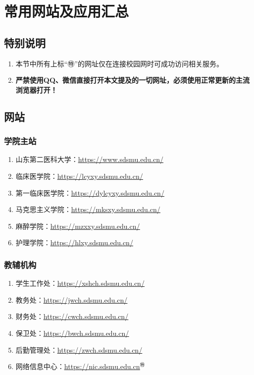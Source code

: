 \chapter[常用网站及应用汇总]{常用网站及应用汇总}

\section*{特别说明}
\begin{enumerate}
    \item 本节中所有上标“㊕”的网址仅在连接校园网时可成功访问相关服务。
    \item \textbf{严禁使用QQ、微信直接打开本文提及的一切网址，必须使用正常更新的主流浏览器打开！}
\end{enumerate}

\section[网站]{网站}
\subsection[学院主站]{学院主站}
\begin{enumerate}
    \item 山东第二医科大学：\uline{\href{https://www.sdsmu.edu.cn/}{https://www.sdsmu.edu.cn/}}
    \item 临床医学院：\uline{\href{https://lcyxy.sdsmu.edu.cn/}{https://lcyxy.sdsmu.edu.cn/}}
    \item 第一临床医学院：\uline{\href{https://dylcyxy.sdsmu.edu.cn/}{https://dylcyxy.sdsmu.edu.cn/}}
    \item 马克思主义学院：\uline{\href{https://mksxy.sdsmu.edu.cn/}{https://mksxy.sdsmu.edu.cn/}}
    \item 麻醉学院：\uline{\href{https://mzxxy.sdsmu.edu.cn/}{https://mzxxy.sdsmu.edu.cn/}}
    \item 护理学院：\uline{\href{https://hlxy.sdsmu.edu.cn/}{https://hlxy.sdsmu.edu.cn/}}
\end{enumerate}

\subsection[教辅机构]{教辅机构}
\begin{enumerate}
    \item 学生工作处：\uline{\href{https://xshch.sdsmu.edu.cn/}{https://xshch.sdsmu.edu.cn/}}
    \item 教务处：\uline{\href{https://jwch.sdsmu.edu.cn/}{https://jwch.sdsmu.edu.cn/}}
    \item 财务处：\uline{\href{https://cwch.sdsmu.edu.cn/}{https://cwch.sdsmu.edu.cn/}}
    \item 保卫处：\uline{\href{https://bwch.sdsmu.edu.cn/}{https://bwch.sdsmu.edu.cn/}}
    \item 后勤管理处：\uline{\href{https://zwch.sdsmu.edu.cn/}{https://zwch.sdsmu.edu.cn/}}
    \item 网络信息中心：\uline{\href{https://nic.sdsmu.edu.cn}{https://nic.sdsmu.edu.cn}$^㊕$}
\end{enumerate}

